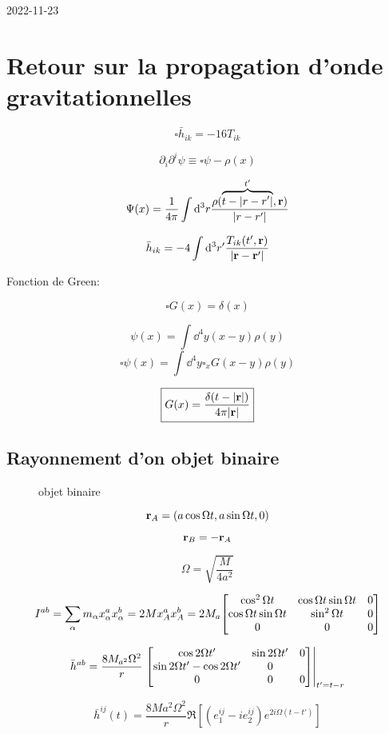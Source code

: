 


2022-11-23

\section*{Retour sur la propagation d'onde gravitationnelles}

\[ \boxed{\square \bar h_{ik} = -16 T_{ik} } \]

\[ \partial_i \partial^{i} \psi \equiv \square \psi - \rho (x)  \]

\[ \Psi(x) = \frac{1}{4\pi} \int \dd^{3}r \frac{\rho(\overbrace{t- \abs{r-r'}}^{t'}, \vb{r} )}{\abs{r -r'} }  \]


\[ \bar h_{ik} =  - 4 \int \dd^{3}r' \frac{T_{ik} (t',\vb{r})}{\abs{\vb{r}-\vb{r}'} }  \]


Fonction de Green:

\[ \square G(x) = \delta (x) \]

\[ \psi(x) = \int \dd^{4}y(x-y)\rho (y) \]
\[ \square \psi(x) = \int \dd^{4}y\square_x G(x-y) \rho(y) \]

\[ \boxed{G(x) = \frac{\delta(t - \abs{\vb{r}} )}{4\pi \abs{\vb{r}} } } \]




\subsection*{Rayonnement d'on objet binaire}



\begin{figure}[ht]
    \centering
    \caption{objet binaire}
    \label{fig:objet-binaire}
\end{figure}


\[ \vb{r}_A = \left( a\cos\Omega t, a\sin \Omega t, 0 \right)  \]

\[ \vb{r}_B = -\vb{r}_A \]


\[ \Omega = \sqrt{\frac{M}{4a^2} } \]


\[ I^{ab} = \sum_{\alpha}^{} m_{\alpha} x_{\alpha}^{a}x_{\alpha}^{b}= 2 M x_A^{a}x_A^{b}= 2 M_a \mqty[\cos^{2}\Omega t & \cos \Omega t \sin \Omega t &0 \\ \cos\Omega t \sin\Omega t & \sin^{2}\Omega t &0 \\0 &0 &0] \]

\[ \bar h^{ab}= \frac{8M_{a^2}\Omega^{2}}{r} \eval{\mqty[\cos 2 \Omega t' &\sin 2\Omega t' & 0 \\ \sin 2\Omega t' - \cos 2 \Omega t' &0 \\ 0 & 0 &0 ]}_{t'=t-r } \]

\[ \bar h^{ij}(t) = \frac{8M a^{2}\Omega^2}{r} \Re \left[ \left( e_1^{ij} - i e_2^{ij} \right) e^{2i\Omega (t-t')} \right]   \]




